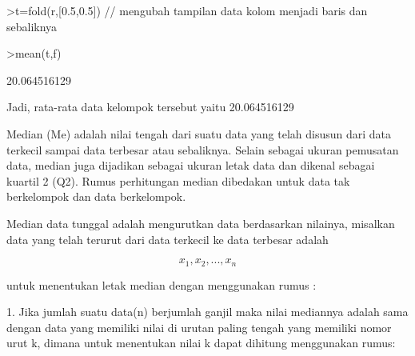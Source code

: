 \documentclass[a4paper,10pt]{article}
\begin{document}
\begin{eulernotebook}
\begin{eulercomment}
\begin{eulercomment}
\begin{eulercomment}
\begin{eulercomment}
\begin{eulercomment}
\begin{eulercomment}
\begin{eulercomment}
\begin{eulercomment}
\begin{eulercomment}
\begin{eulercomment}
\begin{eulerprompt}
>t=fold(r,[0.5,0.5]) // mengubah tampilan data kolom menjadi baris dan sebaliknya
\end{eulerprompt}
\begin{euleroutput}
  [12,  17,  22,  27]
\end{euleroutput}
\begin{eulerprompt}
>mean(t,f)
\end{eulerprompt}
\begin{euleroutput}
  20.064516129
\end{euleroutput}
\begin{eulercomment}
Jadi, rata-rata data kelompok tersebut yaitu 20.064516129\\
\end{eulercomment}
\begin{eulercomment}
Median (Me) adalah nilai tengah dari suatu data yang telah disusun
dari data terkecil sampai data terbesar atau sebaliknya. Selain
sebagai ukuran pemusatan data, median juga dijadikan sebagai ukuran
letak data dan dikenal sebagai kuartil 2 (Q2). Rumus perhitungan
median dibedakan untuk data tak berkelompok dan data berkelompok.

\end{eulercomment}
\begin{eulercomment}
Median data tunggal adalah mengurutkan data berdasarkan nilainya,
misalkan data yang telah terurut dari data terkecil ke data terbesar
adalah\\
\end{eulercomment}
\begin{eulerformula}
\[
x_1, x_2,..., x_n
\]
\end{eulerformula}
\begin{eulerttcomment}
 untuk menentukan letak median dengan menggunakan rumus :
\end{eulerttcomment}
\begin{eulercomment}
1. Jika jumlah suatu data(n) berjumlah ganjil maka nilai mediannya
adalah sama dengan data yang memiliki nilai di urutan paling tengah
yang memiliki nomor urut k, dimana untuk menentukan nilai k dapat
dihitung menggunakan rumus:


\end{eulercomment}
\end{eulercomment}
\end{eulercomment}
\end{eulercomment}
\end{eulercomment}
\end{eulercomment}
\end{eulercomment}
\end{eulercomment}
\end{eulercomment}
\end{eulercomment}
\end{eulercomment}
\end{eulernotebook}
\end{document}

